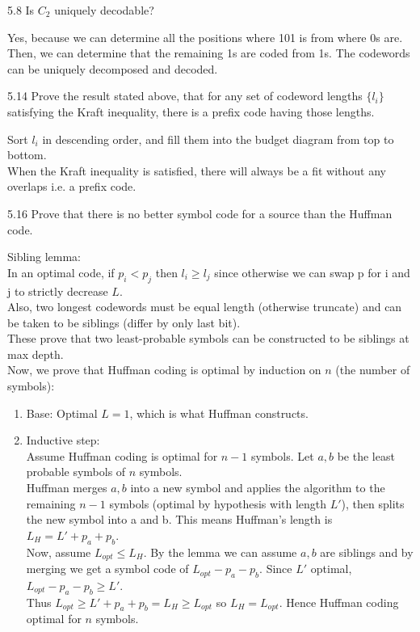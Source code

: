 \documentclass[12pt, a4paper]{article}
\begin{document}
\begin{prob}{5.8}
Is $C_2$ uniquely decodable?
\end{prob}
\begin{sol}
Yes, because we can determine all the positions where 101 is from where 0s are. Then, we can determine that the remaining 1s are coded from 1s.
The codewords can be uniquely decomposed and decoded.
\end{sol}
\bigskip

\begin{prob}{5.14}
Prove the result stated above, that for any set of codeword lengths $\{l_i\}$ satisfying the Kraft inequality,
there is a prefix code having those lengths.
\end{prob}
\begin{sol}
Sort $l_i$ in descending order, and fill them into the budget diagram from top to bottom. \\
When the Kraft inequality is satisfied, there will always be a fit without any overlaps i.e. a prefix code.
\end{sol}
\bigskip


\begin{prob}{5.16}
    Prove that there is no better symbol code for a source than the Huffman code.
\end{prob}
\begin{sol}
Sibling lemma: \\
In an optimal code, if $p_i < p_j$ then $l_i \ge l_j$ since otherwise we can swap p for i and j to strictly decrease $L$. \\
Also, two longest codewords must be equal length (otherwise truncate) and can be taken to be siblings (differ by only last bit). \\
These prove that two least-probable symbols can be constructed to be siblings at max depth. \\

Now, we prove that Huffman coding is optimal by induction on $n$ (the number of symbols):
\begin{enumerate}[label=(\roman*)]
    \item Base: Optimal $L = 1$, which is what Huffman constructs.
    \item Inductive step: \\
    Assume Huffman coding is optimal for $n-1$ symbols. Let $a, b$ be the least probable symbols of $n$ symbols. \\
    Huffman merges $a, b$ into a new symbol and applies the algorithm to the remaining $n-1$ symbols (optimal by hypothesis with length $L'$), then splits the new symbol into a and b. This means Huffman's length is $L_H = L' + p_a + p_b$. \\
    Now, assume $L_{opt} \le L_H$. By the lemma we can assume $a, b$ are siblings and by merging we get a symbol code of $L_{opt} - p_a - p_b$. Since $L'$ optimal, $L_{opt} - p_a - p_b \ge L'$. \\
    Thus $L_{opt} \ge L' + p_a + p_b = L_H \ge L_{opt}$ so $L_H = L_{opt}$. Hence Huffman coding optimal for $n$ symbols.
\end{enumerate}

\end{sol}
\bigskip
\end{document}
